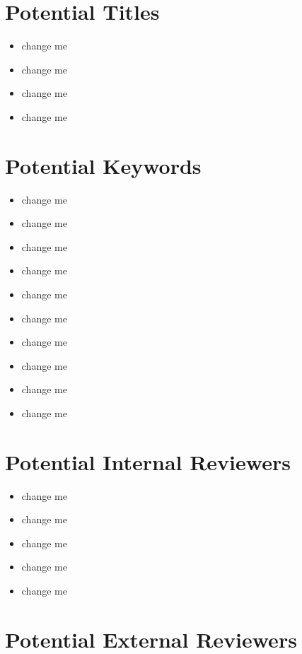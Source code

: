\documentclass[10pt,letterpaper]{article}
\begin{document}
\begin{itemize}
\begin{itemize}
\section{Potential Titles}
  \begin{itemize}
  \item change me
  \item change me
  \item change me
  \item change me
\end{itemize}

\section{Potential Keywords}


\begin{itemize}
  \item change me
  \item change me
  \item change me
  \item change me
  \item change me
  \item change me
  \item change me
  \item change me
  \item change me
  \item change me
\end{itemize}


\section{Potential Internal Reviewers}

\begin{itemize}
  \item change me
  \item change me
  \item change me
  \item change me
  \item change me
\end{itemize}


\section{Potential External Reviewers}


\end{itemize}
\end{itemize}
\end{document}
